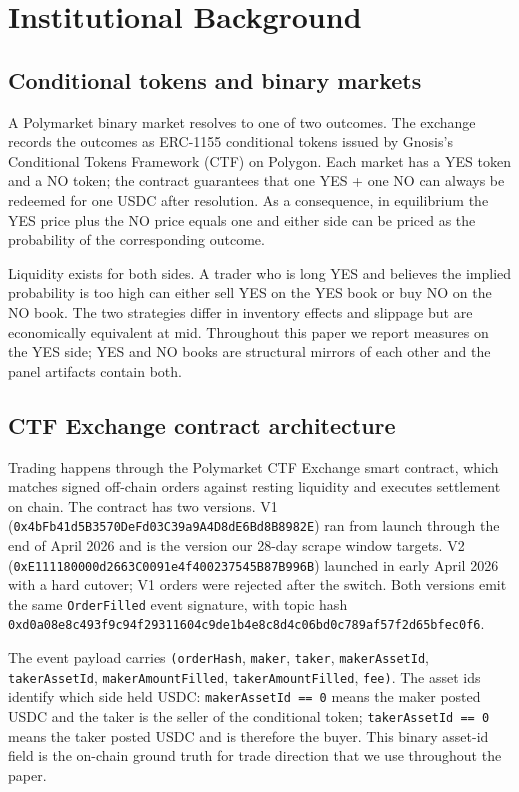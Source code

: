 \section{Institutional Background}\label{sec:background}

\subsection{Conditional tokens and binary markets}

A Polymarket binary market resolves to one of two outcomes. The
exchange records the outcomes as ERC-1155 conditional tokens issued
by Gnosis's Conditional Tokens Framework (CTF) on Polygon. Each
market has a YES token and a NO token; the contract guarantees that
one YES + one NO can always be redeemed for one USDC after
resolution. As a consequence, in equilibrium the YES price plus the
NO price equals one and either side can be priced as the
probability of the corresponding outcome.

Liquidity exists for both sides. A trader who is long YES and
believes the implied probability is too high can either sell YES on
the YES book or buy NO on the NO book. The two strategies differ in
inventory effects and slippage but are economically equivalent at
mid. Throughout this paper we report measures on the YES side; YES
and NO books are structural mirrors of each other and the panel
artifacts contain both.

\subsection{CTF Exchange contract architecture}

Trading happens through the Polymarket CTF Exchange smart contract,
which matches signed off-chain orders against resting liquidity and
executes settlement on chain. The contract has two versions. V1
(\texttt{0x4bFb41d5\allowbreak B3570DeFd03\allowbreak C39a9A4D8dE6Bd8\allowbreak B8982E})
ran from launch through the end of April 2026 and is the version our
28-day scrape window targets. V2
(\texttt{0xE111180000d2663C\allowbreak 0091e4f400237545\allowbreak B87B996B})
launched in early April 2026 with a hard cutover; V1 orders were
rejected after the switch. Both versions emit the same
\texttt{OrderFilled} event signature, with topic hash
\texttt{0xd0a08e8c\allowbreak 493f9c94f29311604c9de\allowbreak 1b4e8c8d4c06bd0c789af57f2d65bfec0f6}.

The event payload carries
\texttt{(orderHash},
\texttt{maker}, \texttt{taker},
\texttt{makerAssetId}, \texttt{takerAssetId},
\texttt{makerAmountFilled},
\texttt{takerAmountFilled}, \texttt{fee)}.
The asset ids identify
which side held USDC: \texttt{makerAssetId == 0} means the maker
posted USDC and the taker is the seller of the conditional token;
\texttt{takerAssetId == 0} means the taker posted USDC and is
therefore the buyer. This binary asset-id field is the on-chain
ground truth for trade direction that we use throughout the paper.

